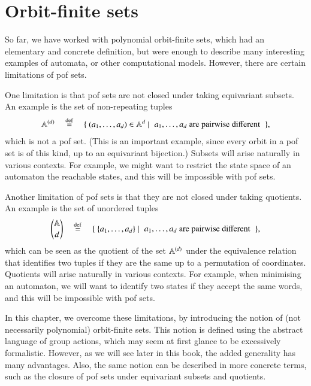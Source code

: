 \chapter{Orbit-finite sets}
\label{cha:orbit-finite-equality}

So far, we have worked with polynomial orbit-finite sets, which had an elementary and concrete definition, but were enough to describe many interesting examples of automata, or other computational models. However,  there are certain limitations of pof sets. 

One limitation is that  pof sets are not closed under taking equivariant subsets. An example is the   set of non-repeating tuples
\begin{align*}
\atoms^{(d)} 
\quad \eqdef \quad 
\setbuild{(a_1,\ldots,a_d) \in \atoms^d}{$a_1,\ldots,a_d$ are pairwise different},
\end{align*}
which is not a pof set. (This is an important example, since every orbit in a pof set is of this kind, up to an equivariant bijection.) Subsets will arise naturally in various contexts. For example, we might want to restrict the state space of an automaton the reachable states, and this will be impossible with pof sets. 

Another limitation of pof sets is that they are not closed under taking quotients. An example is the set of unordered tuples 
\begin{align*}
{\atoms \choose d} 
\quad \eqdef \quad
\setbuild{\set{a_1,\ldots,a_d}}{$a_1,\ldots,a_d$ are pairwise different},
\end{align*}
which can be seen as the quotient of the set $\mathbb A^{(d)}$  under the equivalence relation that identifies two tuples if they are the same up to a permutation of coordinates. Quotients will arise naturally in various contexts. For example, when minimising an automaton, we will want to identify two states if they accept the same words, and this will be impossible with pof sets. 

In this chapter, we overcome these limitations, by introducing the notion of (not necessarily polynomial) orbit-finite sets. This notion is defined using the abstract language  of group actions, which may seem at first glance to be excessively formalistic. However, as we will see later in this book, the added generality has many advantages. Also, the same notion can be described in more concrete terms, such as the closure of pof sets under equivariant subsets and quotients.



